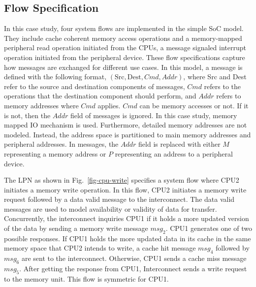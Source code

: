 \documentclass[conference]{IEEEtran}
\begin{document}
\subsection{Flow Specification}

In this case study, four system flows are implemented in the simple SoC model. They include cache coherent memory access operations and a memory-mapped peripheral read operation initiated from the CPUs, a message signaled interrupt operation initiated from the peripheral device.  These flow specifications capture how messages are exchanged for different use cases.  In this model, a message is defined with the following format, $(\mbox{Src}, \mbox{Dest}, \mathit{Cmd}, \mathit{Addr})$, where Src and Dest refer to the source and destination components of messages, $\mathit{Cmd}$ refers to the operations that the destination component should perform, and $\mathit{Addr}$ refers to memory addresses where $\mathit{Cmd}$ applies.  $\mathit{Cmd}$ can be memory accesses or not.  If it is not, then the $\mathit{Addr}$ field of messages is ignored.  In this case study, memory mapped IO mechanism is used.  Furthermore, detailed memory addresses are not modeled. Instead, the address space is partitioned to main memory addresses and peripheral addresses.  In messages, the $\mathit{Addr}$ field is replaced with either $M$ representing a memory address or $P$ representing an address to a peripheral device.  

The LPN as shown in Fig.~\ref{fig-cpu-write} specifies a system flow where {CPU2} initiates a memory write operation.   In this flow, CPU2 initiates a memory write request followed by a data valid message to the interconnect.  The data valid messages are used to model availability or validity of data for transfer.  Concurrently, the interconnect inquiries CPU1 if it holds a more updated version of the data by sending a memory write message $\mathit{msg_2}$.   CPU1 generates one of two possible responses.  If CPU1 holds the more updated data in its cache in the same memory space that CPU2 intends to write, a cache hit message $\mathit{msg_4}$ followed by $\mathit{msg_6}$ are sent to the interconnect.  Otherwise, CPU1 sends a cache miss message $\mathit{msg_5}$.  After getting the response from CPU1, Interconnect sends a write request to the memory unit.  This flow is symmetric for CPU1.
\end{document}
